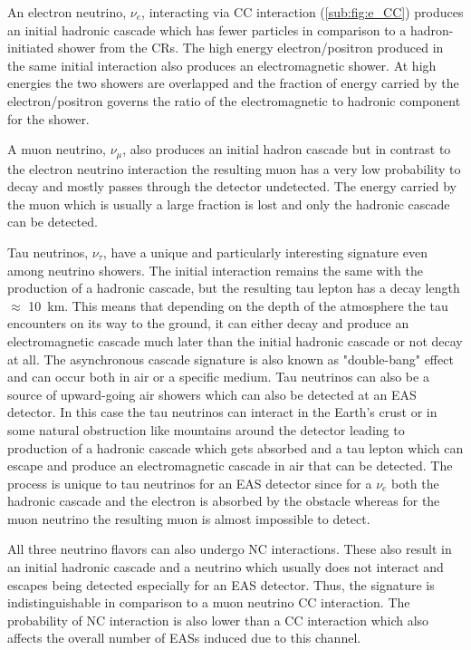 An electron neutrino, $\nu_e$, interacting via CC interaction (\ref{sub:fig:e_CC}) produces an initial hadronic cascade which has fewer particles in comparison to a hadron-initiated shower from the CRs. The high energy electron/positron produced in the same initial interaction also produces an electromagnetic shower. At high energies the two showers are overlapped and the fraction of energy carried by the electron/positron governs the ratio of the electromagnetic to hadronic component for the shower.

A muon neutrino, $\nu_{\mu}$, also produces an initial hadron cascade but in contrast to the electron neutrino interaction the resulting muon has a very low probability to decay and mostly passes through the detector undetected. The energy carried by the muon which is usually a large fraction is lost and only the hadronic cascade can be detected.

Tau neutrinos, $\nu_{\tau}$, have a unique and particularly interesting signature even among neutrino showers. The initial interaction remains the same with the production of a hadronic cascade, but the resulting tau lepton has a decay length $\approx$ 10 km. This means that depending on the depth of the atmosphere the tau encounters on its way to the ground, it can either decay and produce an electromagnetic cascade much later than the initial hadronic cascade or not decay at all. The asynchronous cascade signature is also known as "double-bang" effect and can occur both in air or a specific medium. Tau neutrinos can also be a source of upward-going air showers which can also be detected at an EAS detector. In this case the tau neutrinos can interact in the Earth's crust or in some natural obstruction like mountains around the detector leading to production of a hadronic cascade which gets absorbed and a tau lepton which can escape and produce an electromagnetic cascade in air that can be detected. The process is unique to tau neutrinos for an EAS detector since for a $\nu_e$ both the hadronic cascade and the electron is absorbed by the obstacle whereas for the muon neutrino the resulting muon is almost impossible to detect.  

All three neutrino flavors can also undergo NC interactions. These also result in an initial hadronic cascade and a neutrino which usually does not interact and escapes being detected especially for an EAS detector. Thus, the signature is indistinguishable in comparison to a muon neutrino CC interaction. The probability of NC interaction is also lower than a CC interaction which also affects the overall number of EASs induced due to this channel.


